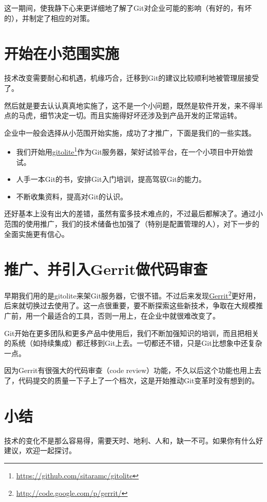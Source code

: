 这一期间，使我静下心来更详细地了解了Git对企业可能的影响（有好的，有坏的），并制定了相应的对策。

\section{开始在小范围实施}
\label{开始在小范围实施}

技术改变需要耐心和机遇，机缘巧合，迁移到Git的建议比较顺利地被管理层接受了。

然后就是要去认认真真地实施了，这不是一个小问题，既然是软件开发，来不得半点的马虎，细节决定一切。而且实施得好坏还涉及到产品开发的正常运转。

企业中一般会选择从小范围开始实施，成功了才推广，下面是我们的一些实践。

\begin{itemize}
\item 我们开始用\href{https://github.com/sitaramc/gitolite}{gitolite}\footnote{\href{https://github.com/sitaramc/gitolite}{https:/\slash github.com\slash sitaramc\slash gitolite}}作为Git服务器，架好试验平台，在一个小项目中开始尝试。

\item 人手一本Git的书，安排Git入门培训，提高驾驭Git的能力。

\item 不断收集资料，提高对Git的认识。

\end{itemize}

还好基本上没有出大的差错，虽然有蛮多技术难点的，不过最后都解决了。通过小范围的使用推广，我们的技术储备也加强了（特别是配置管理的人），对下一步的全面实施更有信心。

\section{推广、并引入Gerrit做代码审查}
\label{推广、并引入gerrit做代码审查}

早期我们用的是gitolite来架Git服务器，它很不错。不过后来发现\href{http://code.google.com/p/gerrit/}{Gerrit}\footnote{\href{http://code.google.com/p/gerrit/}{http:/\slash code.google.com\slash p\slash gerrit\slash }}更好用，后来就切换过去使用了。这一点很重要，要不断探索这些新技术，争取在大规模推广前，用一个最适合的工具，否则一用上，在企业中就很难改变了。

Git开始在更多团队和更多产品中使用后，我们不断加强知识的培训，而且把相关的系统（如持续集成）都迁移到Git上去。一切都还不错，只是Git比想象中还复杂一点。

因为Gerrit有很强大的代码审查（code review）功能，不久以后这个功能也用上去了，代码提交的质量一下子上了一个档次，这是开始推动Git变革时没有想到的。

\section{小结}
\label{小结}

技术的变化不是那么容易得，需要天时、地利、人和，缺一不可。如果你有什么好建议，欢迎一起探讨。
